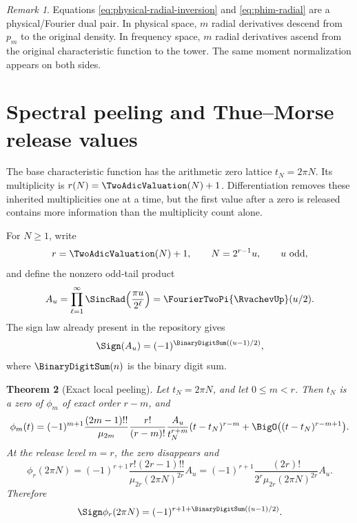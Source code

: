 \documentclass[11pt,oneside]{article}
\newtheorem{theorem}{Theorem}[section]
\theoremstyle{definition}
\theoremstyle{remark}
\newtheorem{remark}[theorem]{Remark}
\begin{document}
\begin{remark}
Equations \eqref{eq:physical-radial-inversion} and
\eqref{eq:phim-radial} are a physical/Fourier dual pair.  In physical space,
$m$ radial derivatives descend from $p_m$ to the original density.  In
frequency space, $m$ radial derivatives ascend from the original
characteristic function to the tower.  The same moment normalization appears
on both sides.
\end{remark}

\section{Spectral peeling and Thue--Morse release values}
\label{sec:spectral-peeling}

The base characteristic function has the arithmetic zero lattice
$t_N=2\pi N$.  Its multiplicity is $r(N)=\TwoAdicValuation(N)+1$.  Differentiation removes
these inherited multiplicities one at a time, but the first value after a zero
is released contains more information than the multiplicity count alone.

For $N\ge1$, write
\begin{equation}
 r=\TwoAdicValuation(N)+1,
 \qquad N=2^{r-1}u,
 \qquad u\text{ odd},                              \label{eq:N-r-u}
\end{equation}
and define the nonzero odd-tail product
\begin{equation}
 A_u=\prod_{\ell=1}^{\infty}
     \SincRad\!\left(\frac{\pi u}{2^\ell}\right)
     =\FourierTwoPi{\RvachevUp}(u/2).                           \label{eq:Au}
\end{equation}
The sign law already present in the repository gives
\begin{equation}
 \Sign(A_u)=(-1)^{\BinaryDigitSum((u-1)/2)},                    \label{eq:Au-sign}
\end{equation}
where $\BinaryDigitSum(n)$ is the binary digit sum.

\begin{theorem}[Exact local peeling]
\label{thm:local-peeling}
Let $t_N=2\pi N$, and let $0\le m<r$.  Then $t_N$ is a zero of $\phi_m$ of
exact order $r-m$, and
\begin{equation}
 \phi_m(t)
 =(-1)^{m+1}\frac{(2m-1)!!}{\mu_{2m}}
   \frac{r!}{(r-m)!}
   \frac{A_u}{t_N^{r+m}}
   (t-t_N)^{r-m}
 +\BigO\bigl((t-t_N)^{r-m+1}\bigr).                \label{eq:local-peeling}
\end{equation}
At the release level $m=r$, the zero disappears and
\begin{equation}
 \boxed{
 \phi_r(2\pi N)
 =(-1)^{r+1}
   \frac{r!(2r-1)!!}{\mu_{2r}(2\pi N)^{2r}}A_u
 =(-1)^{r+1}
   \frac{(2r)!}{2^r\mu_{2r}(2\pi N)^{2r}}A_u.}     \label{eq:released-value}
\end{equation}
Therefore
\begin{equation}
 \Sign\phi_r(2\pi N)
 =(-1)^{r+1+\BinaryDigitSum((u-1)/2)}.                          \label{eq:released-sign}
\end{equation}
\end{theorem}
\end{document}
